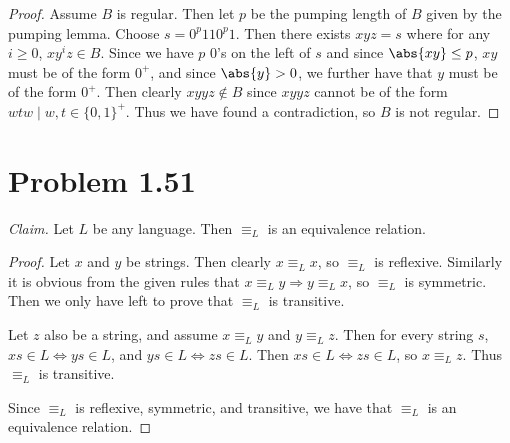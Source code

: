 \documentclass{abrice}
\begin{document}
\begin{proof}
  Assume $B$ is regular. Then let $p$ be the pumping length of $B$ given by the
  pumping lemma. Choose $s = 0^p 1 1 0^p 1$. Then there exists $xyz = s$
  where for any $i \geq 0$, $x y^i z \in B$. Since we have $p$ $0$'s on the left
  of $s$ and since $\abs{xy} \leq p$, $xy$ must be of the form $0^+$, and since
  $\abs{y} > 0$, we further have that $y$ must be of the form $0^+$. Then
  clearly $xyyz \notin B$ since $xyyz$ cannot be of the form $wtw \mid w,t \in
  {\{0,1\}}^+$. Thus we have found a contradiction, so $B$ is not regular.
\end{proof}

\section{Problem 1.51}

\emph{Claim.} Let $L$ be any language. Then $\equiv_L$ is an equivalence
relation.

\begin{proof}
  Let $x$ and $y$ be strings. Then clearly $x \equiv_L x$, so $\equiv_L$ is
  reflexive. Similarly it is obvious from the given rules that $x \equiv_L y
  \Rightarrow y \equiv_L x$, so $\equiv_L$ is symmetric. Then we only have left
  to prove that $\equiv_L$ is transitive.

  Let $z$ also be a string, and assume $x \equiv_L y$ and $y \equiv_L z$.
  Then for every string $s$, $xs \in L \Leftrightarrow ys \in L$, and
  $ys \in L \Leftrightarrow zs \in L$. Then $xs \in L \Leftrightarrow zs \in L$,
  so $x \equiv_L z$. Thus $\equiv_L$ is transitive.

  Since $\equiv_L$ is reflexive, symmetric, and transitive, we have that
  $\equiv_L$ is an equivalence relation.
\end{proof}
\end{document}
